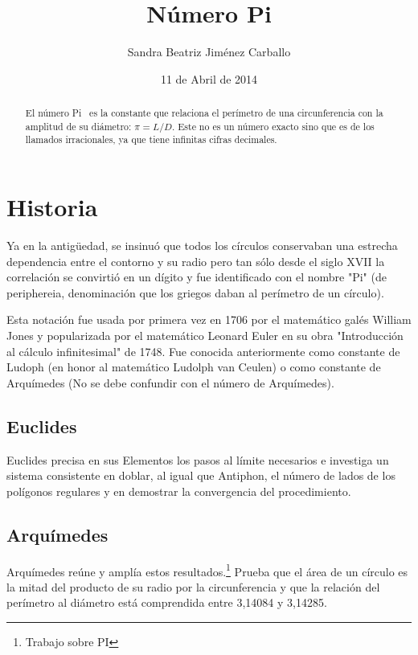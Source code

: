 \documentclass[spanish,11pt,a4paper]{article}
\begin{document}
 
\title{Número Pi} %
\author{Sandra Beatriz Jiménez Carballo} %
\date{11 de Abril de 2014} 
\maketitle

\begin{abstract}
 El número Pi~\cite{Lamport:LDP94} es la constante que relaciona el perímetro de una circunferencia con la amplitud de su diámetro: $\pi = L/D$.
 Este no es un número exacto sino que es de los llamados irracionales, ya que tiene infinitas cifras decimales.
\end{abstract}

\section{Historia}
Ya en la antigüedad, se insinuó que todos los círculos conservaban una estrecha dependencia entre el contorno y su radio pero tan sólo desde el
siglo XVII la correlación se convirtió en un dígito\cite{gibaldMLA:2009} y fue identificado con el nombre "Pi" (de periphereia, denominación que los griegos daban
al perímetro de un círculo).

Esta notación fue usada por primera vez en 1706 por el matemático galés William Jones y popularizada por el matemático Leonard Euler en su obra
"Introducción al cálculo infinitesimal" de 1748. Fue conocida anteriormente como constante de Ludoph (en honor al matemático Ludolph van Ceulen)
o como constante de Arquímedes (No se debe confundir con el número de Arquímedes).

\subsection{Euclides}
Euclides precisa en sus Elementos los pasos al límite necesarios e investiga un sistema consistente en doblar, al igual que Antiphon, el número de
lados de los polígonos regulares y en demostrar la convergencia del procedimiento.

\subsection{Arquímedes}
Arquímedes reúne y amplía estos resultados.\footnote{Trabajo sobre PI} Prueba que el área de un círculo es la mitad del producto de su radio por la circunferencia y que la
relación del perímetro al diámetro está comprendida entre 3,14084 y 3,14285.
\end{document}
